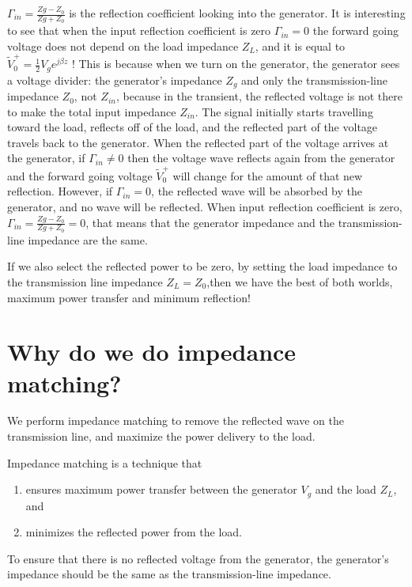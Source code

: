 \documentclass{ximera}
\begin{document}
$\Gamma_{in}=\frac{Zg-Z_0}{Zg+Z_0}$ is the reflection coefficient looking into the generator. It is interesting to see that when the input reflection coefficient is zero $\Gamma_{in}=0$ the forward going voltage does not depend on the load impedance $Z_L$, and it is equal to $\tilde{V}_0^+=\frac{1}{2} V_g e^{j \beta z}$ ! This is because when we turn on the generator, the generator sees a voltage divider: the generator's impedance $Z_g$ and only the transmission-line impedance $Z_0$, not $Z_{in}$, because in the transient, the reflected voltage is not there to make the total input impedance $Z_{in}$. The signal initially starts travelling toward the load, reflects off of the load, and the reflected part of the voltage travels back to the generator. When the reflected part of the voltage arrives at the generator, if $\Gamma_{in}\neq 0$ then the voltage wave reflects again from the generator and the forward going voltage $\tilde{V}_0^+$ will change for the amount of that new reflection. However, if $\Gamma_{in}= 0$, the reflected wave will be absorbed by the generator, and no wave will be reflected. When input reflection coefficient is zero, $\Gamma_{in}=\frac{Zg-Z_0}{Zg+Z_0} = 0$, that means that the generator impedance and the transmission-line impedance are the same.

If we also select the reflected power to be zero, by setting the load impedance to the transmission line impedance $Z_L=Z_0$,then we have the best of both worlds, maximum power transfer and minimum reflection!


\section{Why do we do impedance matching?}



We perform impedance matching to remove the reflected wave on the transmission line, and maximize the power delivery to the load.

Impedance matching is a technique that 
\begin{enumerate}
\item ensures maximum power transfer between the generator $V_g$ and the load $Z_L$, and 
\item minimizes the reflected power from the load. 
\end{enumerate}

To ensure that there is no reflected voltage from the generator, the generator's impedance should be the same as the transmission-line impedance. 
\end{document}
